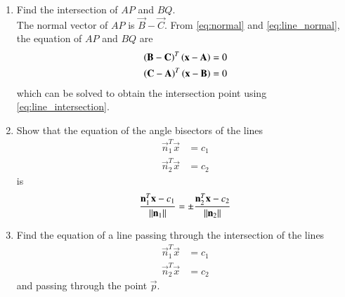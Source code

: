 \begin{enumerate}[label=\arabic*.,ref=\thesubsection.\theenumi]
\item
\label{prob:alt_eq}
Find the intersection of $AP$ and $BQ$.
\\
\solution The normal vector of $AP$ is $\vec{B} - \vec{C}$. From \eqref{eq:normal}
and \eqref{eq:line_normal},
 the equation of $AP$ and $BQ$ are
\begin{align}
\label{eq:alt_ap}
\left(\mathbf{B} - \mathbf{C}\right)^T\left(\mathbf{x} - \mathbf{A}\right)&= 0
\\
\label{eq:alt_bq}
\left(\mathbf{C} - \mathbf{A}\right)^T\left(\mathbf{x} - \mathbf{B}\right)&= 0
\end{align}
which can be solved to obtain the intersection point using \eqref{eq:line_intersection}.
\item Show that the equation of the angle bisectors of the lines
\begin{align}
\vec{n}_1^T\vec{x} &=c_1
\\
\vec{n}_2^T\vec{x} &=c_2
\end{align}
%
is
\begin{align}
\frac{\mathbf{n}_1^T\mathbf{x}-c_1}{\left\lVert\mathbf{n}_1\right\rVert}=\pm\frac{\mathbf{n}_2^T\mathbf{x} -c_2}{\left\lVert\mathbf{n}_2\right\rVert}\end{align}
\item Find the equation of a line passing through the intersection of the lines
\begin{align}
\label{eq:line1}
\vec{n}_1^T\vec{x} &=c_1
\\
\vec{n}_2^T\vec{x} &=c_2
\label{eq:line2}
\end{align}
and passing through the point $\vec{p}$.
\\
\solution 
%

\end{enumerate}
